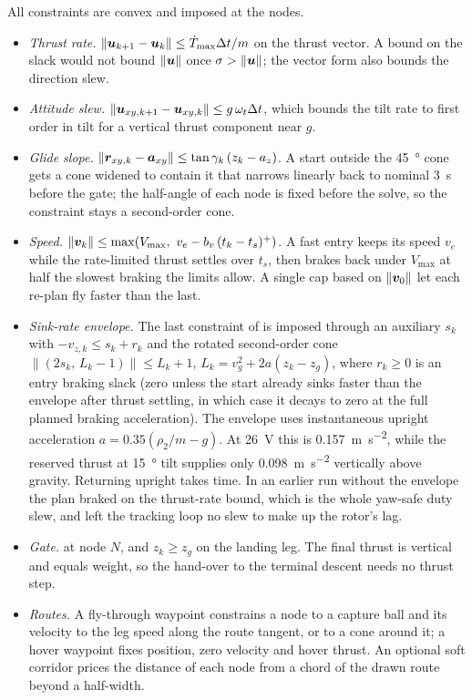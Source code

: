 \documentclass[10pt,letterpaper]{article}
\begin{document}
All constraints are convex and imposed at the nodes.
\begin{itemize}
\item \textit{Thrust rate.} $\|\bm{u}_{k+1} - \bm{u}_k\| \le \dot T_{\max}\Delta t/m$ on the thrust vector. A bound on the slack would not bound $\|\bm{u}\|$ once $\sigma > \|\bm{u}\|$; the vector form also bounds the direction slew.
\item \textit{Attitude slew.} $\|\bm{u}_{xy,k+1} - \bm{u}_{xy,k}\| \le g\,\omega_t\Delta t$, which bounds the tilt rate to first order in tilt for a vertical thrust component near $g$.
\item \textit{Glide slope.} $\|\bm{r}_{xy,k} - \bm{a}_{xy}\| \le \tan\gamma_k\,(z_k - a_z)$. A start outside the \SI{45}{\degree} cone gets a cone widened to contain it that narrows linearly back to nominal \SI{3}{\second} before the gate; the half-angle of each node is fixed before the solve, so the constraint stays a second-order cone.
\item \textit{Speed.} $\|\bm{v}_k\| \le \max\!\left(V_{\max},\ v_e - b_v\,(t_k - t_s)^+\right)$. A fast entry keeps its speed $v_e$ while the rate-limited thrust settles over $t_s$, then brakes back under $V_{\max}$ at half the slowest braking the limits allow. A single cap based on $\|\bm{v}_0\|$ let each re-plan fly faster than the last.
\item \textit{Sink-rate envelope.} The last constraint of  is imposed through an auxiliary $s_k$ with $-v_{z,k} \le s_k + r_k$ and the rotated second-order cone $\|(2s_k,\, L_k - 1)\| \le L_k + 1$, $L_k = v_g^2 + 2a(z_k - z_g)$, where $r_k \ge 0$ is an entry braking slack (zero unless the start already sinks faster than the envelope after thrust settling, in which case it decays to zero at the full planned braking acceleration). The envelope uses instantaneous upright acceleration $a=0.35(\rho_2/m-g)$. At \SI{26}{\volt} this is \SI{0.157}{\metre\per\second\squared}, while the reserved thrust at \SI{15}{\degree} tilt supplies only \SI{0.098}{\metre\per\second\squared} vertically above gravity. Returning upright takes time. In an earlier run without the envelope the plan braked on the thrust-rate bound, which is the whole yaw-safe duty slew, and left the tracking loop no slew to make up the rotor's lag.
\item \textit{Gate.}  at node $N$, and $z_k \ge z_g$ on the landing leg. The final thrust is vertical and equals weight, so the hand-over to the terminal descent needs no thrust step.
\item \textit{Routes.} A fly-through waypoint constrains a node to a capture ball and its velocity to the leg speed along the route tangent, or to a cone around it; a hover waypoint fixes position, zero velocity and hover thrust. An optional soft corridor prices the distance of each node from a chord of the drawn route beyond a half-width.
\end{itemize}
\end{document}
